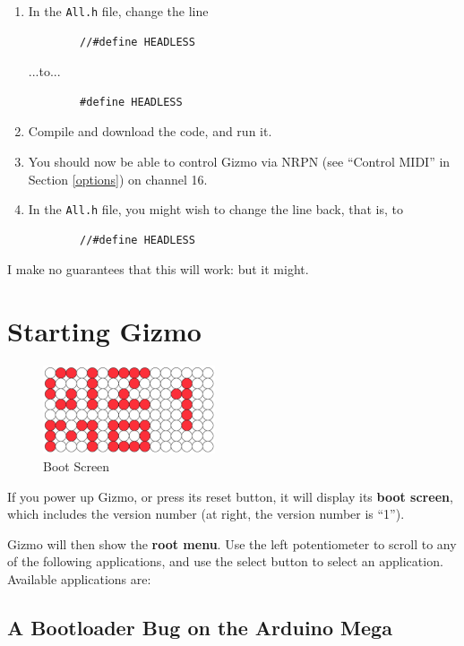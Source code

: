 \documentclass{article}
\begin{document}
\begin{enumerate}
\item In the \texttt{All.h} file, change the line 
\begin{verbatim}
        //#define HEADLESS
\end{verbatim}
...to...
\begin{verbatim}
        #define HEADLESS
\end{verbatim}
\item Compile and download the code, and run it.
\item You should now be able to control Gizmo via NRPN (see ``Control MIDI'' in Section \ref{options}) on channel 16.
\item In the \texttt{All.h} file, you might wish to change the line back, that is, to 
\begin{verbatim}
        //#define HEADLESS
\end{verbatim}

\end{enumerate}

I make no guarantees that this will work: but it might.

\clearpage
\section{Starting Gizmo}

\begin{figure}
\vspace{-1.5em}\includegraphics[width=2in]{Gizmo1.pdf}
\vspace{-2em}\caption{\small Boot Screen}\vspace{-2em}
\label{BootScreen}
\end{figure}

If you power up Gizmo, or press its reset button, it will display its {\bf boot screen}, which includes the version number (at right, the version number is ``1'').

Gizmo will then show the {\bf root menu}.  Use the left potentiometer to scroll to any of the following applications, and use the select button to select an application.  Available applications are:

\subsection{A Bootloader Bug on the Arduino Mega}
\end{document}
